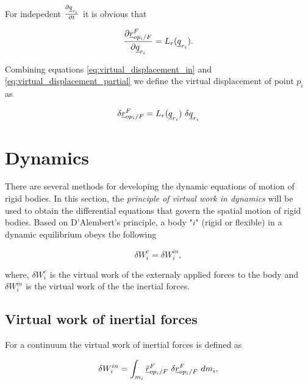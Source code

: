 For indepedent $\frac{\partial \underline{q}_{r_{i}}}{\partial t}$ it is obvious that 

\begin{equation}
    \frac{\partial \pvec{r}{op_{i}}{F}{F}}{\partial \vecd{q}_{r_{i}}}
    = L_{r}(\vecd{q}_{r_{i}}).
    \label{eq:virtual_displacement_partial}
\end{equation}

Combining equations \eqref{eq:virtual_displacement_in} and 
\eqref{eq:virtual_displacement_partial} we define the virtual displacement of 
point $p_{i}$ as  

\begin{equation}
    \delta \pvec{r}{op_{i}}{F}{F} = L_{r}(\vecd{q}_{r_{i}})\ \delta \vecd{q}_{r_{i}}
    \label{eq:virtual_displacement}
\end{equation}

\section{Dynamics}

There are several methods for developing the dynamic equations of motion of
rigid bodies. In this section, the \textit{principle of virtual work in dynamics} 
will
be used to obtain the differential equations that govern the spatial motion of
rigid bodies. Based on D'Alembert's principle, a body "$i$" (rigid or flexible) 
in a dynamic equilibrium obeys the following 

\begin{equation}
    \delta W^{e}_{i} = \delta W^{in}_{i},
    \label{eq:principle_of_virtual_work}
\end{equation}

where, $\delta W^{e}_{i}$ is the virtual work of the externaly applied forces 
to the body and $\delta W^{in}_{i}$ is the virtual work of the the inertial forces.

\subsection{Virtual work of inertial forces}
For a continuum the virtual work of inertial forces is defined as 

\begin{equation}
    \delta W^{in}_{i} = 
    \int_{m_i} \pvec{\ddot{r}}{op_{i}}{F}{F} \  \delta\pvec{r}{op_{i}}{F}{F} \ dm_{i},
    \label{eq:virtual_work_inertial_definition}
\end{equation}

